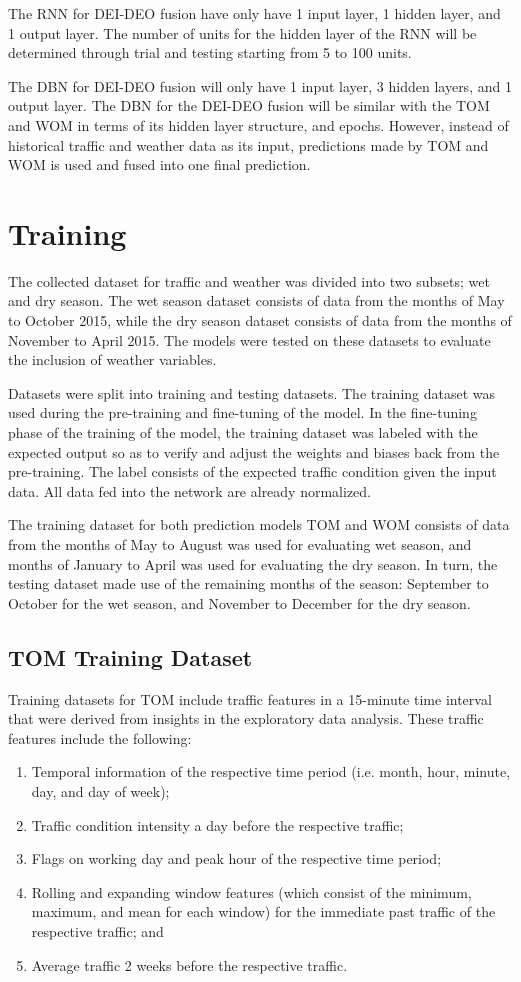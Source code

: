 The RNN for DEI-DEO fusion have only have 1 input layer, 1 hidden layer, and 1 output layer. The number of units for the hidden layer of the RNN will be determined through trial and testing starting from 5 to 100 units.

The DBN for DEI-DEO fusion will only have 1 input layer, 3 hidden layers, and 1 output layer. The DBN for the DEI-DEO fusion will be similar with the TOM and WOM in terms of its hidden layer structure, and epochs. However, instead of historical traffic and weather data as its input, predictions made by TOM and WOM is used and fused into one final prediction.

\section{Training}
The collected dataset for traffic and weather was divided into two subsets; wet and dry season. The wet season dataset consists of data from the months of May to October 2015, while the dry season dataset consists of data from the months of November to April 2015. The models were tested on these datasets to evaluate the inclusion of weather variables.

Datasets were split into training and testing datasets. The training dataset was used during the pre-training and fine-tuning of the model. In the fine-tuning phase of the training of the model, the training dataset was labeled with the expected output so as to verify and adjust the weights and biases back from the pre-training. The label consists of the expected traffic condition given the input data. All data fed into the network are already normalized.

The training dataset for both prediction models TOM and WOM consists of data from the months of May to August was used for evaluating wet season, and months of January to April was used for evaluating the dry season. In turn, the testing dataset made use of the remaining months of the season: September to October for the wet season, and November to December for the dry season.

\subsection{TOM Training Dataset}
Training datasets for TOM include traffic features in a 15-minute time interval that were derived from insights in the exploratory data analysis. These traffic features include the following:
 \begin{enumerate}
\item Temporal information of the respective time period (i.e. month, hour, minute, day, and day of week);
\item Traffic condition intensity a day before the respective traffic;
\item Flags on working day and peak hour of the respective time period;
\item Rolling and expanding window features (which consist of the minimum, maximum, and mean for each window) for the immediate past traffic of the respective traffic; and
\item Average traffic 2 weeks before the respective traffic.
\end{enumerate}

